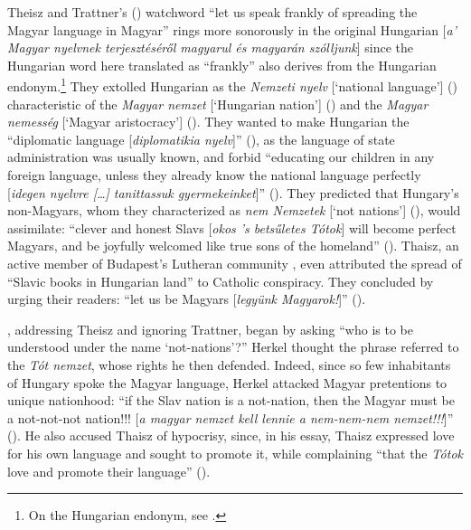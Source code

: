Theisz and Trattner’s (\citeyear[118]{thaisz_jelentes_1825}) watchword “let us speak frankly of spreading the Magyar language in Magyar” rings more sonorously in the original Hungarian [\textit{a’ Magyar nyelvnek terjesztéséről magyarul és magyarán szólljunk}] since the Hungarian word here translated as “frankly” also derives from the Hungarian endonym.\footnote{On the Hungarian endonym, see \citet[14--21]{maxwell_everyday_2019}.} They extolled Hungarian as the \textit{Nemzeti nyelv} [‘national language’] (\citeyear[118, 124, 126]{thaisz_jelentes_1825}) characteristic of the \textit{Magyar nemzet} [‘Hungarian nation’] (\citeyear[119, 120, 125]{thaisz_jelentes_1825}) and the \textit{Magyar nemesség} [‘Magyar aristocracy’] (\citeyear[126]{thaisz_jelentes_1825}). They wanted to make Hungarian the “diplomatic language [\textit{diplomatikia nyelv}]” (\citeyear[126]{thaisz_jelentes_1825}), as the language of state administration was usually known, and forbid “educating our children in any foreign language, unless they already know the national language perfectly [\textit{idegen nyelvre […] tanittassuk gyermekeinket}]” (\citeyear[124]{thaisz_jelentes_1825}). They predicted that Hungary’s non-Magyars, whom they characterized as \textit{nem Nemzetek} [‘not nations’] (\citeyear[118]{thaisz_jelentes_1825}), would assimilate: “clever and honest Slavs [\textit{okos ’s betsűletes Tótok}] will become perfect Magyars, and be joyfully welcomed like true sons of the homeland” (\citeyear[125]{thaisz_jelentes_1825}). Thaisz, an active member of Budapest’s Lutheran community \citep[176, 178]{laszlo_evangelikus_2004}, even attributed the spread of “Slavic books in Hungarian land” to Catholic conspiracy. They concluded by urging their readers: “let us be Magyars [\textit{legyünk Magyarok!}]” (\citeyear[126]{thaisz_jelentes_1825}).

\citet[227]{herkel_jegyzesek_1969}, addressing Theisz and ignoring Trattner, began by asking “who is to be understood under the name ‘not-nations’?” Herkel thought the phrase referred to the \textit{Tót nemzet}, whose rights he then defended. Indeed, since so few inhabitants of Hungary spoke the Magyar language, Herkel attacked Magyar pretentions to unique nationhood: “if the Slav nation is a not-nation, then the Magyar must be a not-not-not nation!!! [\textit{a magyar nemzet kell lennie a nem-nem-nem nemzet!!!}]” (\citeyear[228]{herkel_jegyzesek_1969}). He also accused Thaisz of hypocrisy, since, in his essay, Thaisz expressed love for his own language and sought to promote it, while complaining “that the \textit{Tótok} love and promote their language” (\citeyear[229]{herkel_jegyzesek_1969}).

